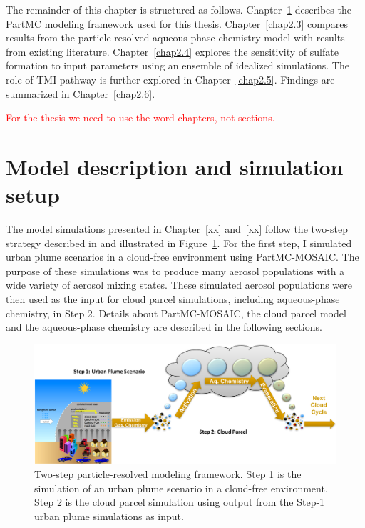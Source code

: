 \documentclass[edeposit,fullpage]{uiucthesis2009}
\begin{document}
The remainder of this chapter is structured as
follows. Chapter~\ref{chap2.2} describes the PartMC modeling framework
used for this thesis. Chapter~\ref{chap2.3} compares results from the
particle-resolved aqueous-phase chemistry model with results from
existing literature. Chapter~\ref{chap2.4} explores the sensitivity of
sulfate formation to input parameters using an ensemble of idealized
simulations. The role of TMI pathway is further explored in
Chapter~\ref{chap2.5}. Findings are summarized in
Chapter~\ref{chap2.6}.

\textcolor{red}{For the thesis we need to use the word chapters, not
  sections.}

\section{Model description and simulation setup}
\label{chap2.2}
The model simulations presented in Chapter~\ref{xx} and~\ref{xx}
follow the two-step strategy described in \citet{ching2012impacts} and
illustrated in Figure~\ref{chap2-fig1-frame}. For the first step, I
simulated urban plume scenarios in a cloud-free environment using
PartMC-MOSAIC. The purpose of these simulations was to produce many
aerosol populations with a wide variety of aerosol mixing
states. These simulated aerosol populations were then used as the
input for cloud parcel simulations, including aqueous-phase chemistry,
in Step 2. Details about PartMC-MOSAIC, the cloud parcel model and the
aqueous-phase chemistry are described in the following sections.

\begin{figure}[ht]
    \centering 
    \includegraphics[scale=0.4]{chap2_figs/chap2-fig1-frame.pdf}
    \caption{Two-step particle-resolved modeling framework. Step 1 is
      the simulation of an urban plume scenario in a cloud-free
      environment. Step 2 is the cloud parcel simulation using output
      from the Step-1 urban plume simulations as input.}
    \label{chap2-fig1-frame}
\end{figure}
\end{document}
